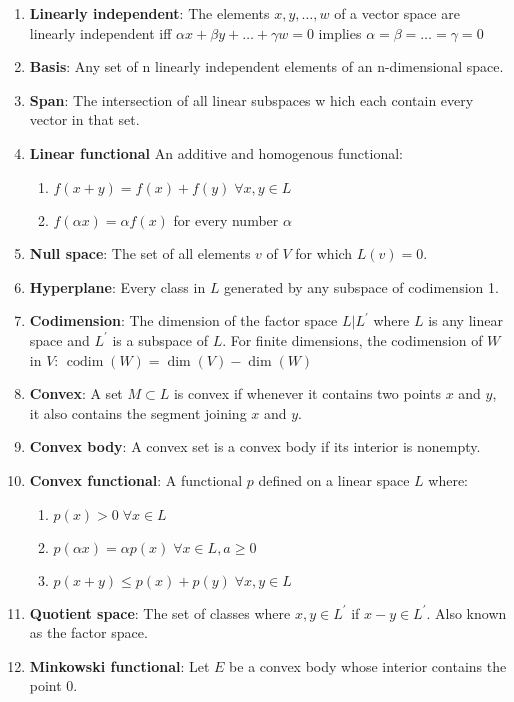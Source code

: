 \documentclass[12pt,letterpaper,reqno]{amsart}
\begin{document}
\begin{enumerate}[1.]
\item \textbf{Linearly independent}: The elements $x, y, \ldots, w$ of a vector space are linearly independent iff $\alpha x + \beta y + \ldots + \gamma w = 0$ implies $\alpha = \beta = \ldots = \gamma = 0$
\item \textbf{Basis}: Any set of n linearly independent elements of an n-dimensional space.
\item \textbf{Span}: The intersection of all linear subspaces w hich each contain every vector in that set.
\item \textbf{Linear functional} An additive and homogenous functional:
    \begin{enumerate}
        \item $f(x+y) = f(x) + f(y) \; \forall x, y \in L$
        \item $f(\alpha x) = \alpha f(x)$ for every number $\alpha$
    \end{enumerate}
\item \textbf{Null space}: The set of all elements $v$ of $V$ for which $L(v) = 0$.
\item \textbf{Hyperplane}: Every class in $L$ generated by any subspace of codimension 1.
\item \textbf{Codimension}: The dimension of the factor space $L|L^\prime$ where $L$ is any linear space and $L^\prime$ is a subspace of $L$. For finite dimensions, the codimension of $W$ in $V$: $\operatorname { codim } ( W ) = \operatorname { dim } ( V ) - \operatorname { dim } ( W )$
\item \textbf{Convex}: A set $M \subset L$ is convex if whenever it contains two points $x$ and $y$, it also contains the segment joining $x$ and $y$.
\item \textbf{Convex body}: A convex set is a convex body if its interior is nonempty.
\item \textbf{Convex functional}: A functional $p$ defined on a linear space $L$ where:
    \begin{enumerate}
        \item $p(x) > 0 \; \forall x \in L$
        \item $p(\alpha x) = \alpha p(x) \; \forall x \in L, a \geq 0$
        \item $p(x+y) \leq p(x) + p(y) \; \forall x,y \in L$
    \end{enumerate}
\item \textbf{Quotient space}: The set of classes where $x,y \in L^\prime$ if $x-y \in L^\prime$. Also known as the factor space.
\item \textbf{Minkowski functional}: Let $E$ be a convex body whose interior contains the point 0.

\end{enumerate}
\end{document}
